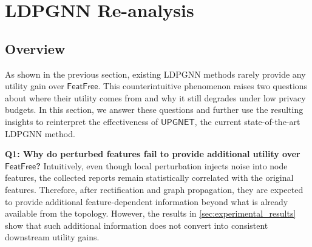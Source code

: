 \documentclass[conference,compsoc]{IEEEtran}
\theoremstyle{boldplain}
\theoremstyle{bolddefinition}
\theoremstyle{remark}
\newcommand{\ff}{\ensuremath{\mathsf{FeatFree}}\xspace}
\newcommand{\ldpgnn}{LDPGNN\xspace}
\newcommand{\upgnet}{\ensuremath{\mathsf{UPGNET}}\xspace}
\begin{document}
\section{LDPGNN Re-analysis}
\label{sec:pipeline_reanalysis}


\subsection{Overview}

As shown in the previous section, existing \ldpgnn methods rarely provide any utility gain over \ff. 
This counterintuitive phenomenon raises two questions about where their utility comes from and why it still degrades under low privacy budgets. 
In this section,
we answer these questions and further use the resulting insights to reinterpret the effectiveness of \upgnet, the current state-of-the-art \ldpgnn method.



\vspace{0.1cm}

\noindent
\textbf{Q1: Why do perturbed features fail to provide additional utility over \ff?} 
Intuitively, even though local perturbation injects noise into node features, the collected reports remain statistically correlated with the original features. 
Therefore, after rectification and graph propagation, they are expected to provide additional feature-dependent information beyond what is already available from the topology. 
However, the results in \autoref{sec:experimental_results} show that such additional information does not convert into consistent downstream utility gains.
\end{document}
